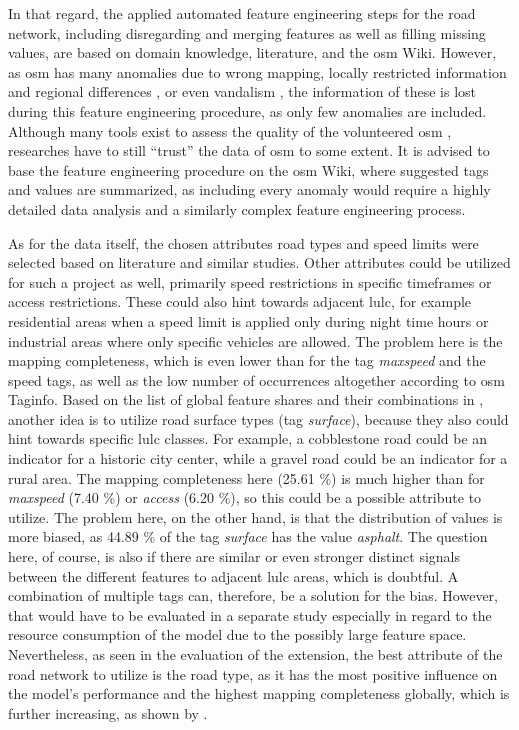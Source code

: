 In that regard, the applied automated feature engineering steps for the road network, including disregarding and merging features as well as filling missing values, are based on domain knowledge, literature, and the \gls{osm} Wiki. However, as \gls{osm} has many anomalies due to wrong mapping, locally restricted information and regional differences \autocite{Ludwig.Fendrich.ea2021}, or even vandalism \autocite{Neis.Goetz.ea2012,Vargas-Munoz.Srivastava.ea2021}, the information of these is lost during this feature engineering procedure, as only few anomalies are included. Although many tools exist to assess the quality of the volunteered \gls{osm} \autocite{Minghini.Frassinelli2019,Moradi.Roche.ea2021,Schott.Zell.ea2024}, researches have to still \enquote{trust} the data of \gls{osm} to some extent. It is advised to base the feature engineering procedure on the \gls{osm} Wiki, where suggested tags and values are summarized, as including every anomaly would require a highly detailed data analysis and a similarly complex feature engineering process.

As for the data itself, the chosen attributes road types and speed limits were selected based on literature and similar studies. Other attributes could be utilized for such a project as well, primarily speed restrictions in specific timeframes or access restrictions. These could also hint towards adjacent \gls{lulc}, for example residential areas when a speed limit is applied only during night time hours or industrial areas where only specific vehicles are allowed. The problem here is the mapping completeness, which is even lower than for the tag \emph{maxspeed} and the speed tags, as well as the low number of occurrences altogether according to \gls{osm} Taginfo. Based on the list of global feature shares and their combinations in \textcite{OSMTaginfo2024}, another idea is to utilize road surface types (tag \emph{surface}), because they also could hint towards specific \gls{lulc} classes. For example, a cobblestone road could be an indicator for a historic city center, while a gravel road could be an indicator for a rural area. The mapping completeness here (25.61 \%) is much higher than for \emph{maxspeed} (7.40 \%) or \emph{access} (6.20 \%), so this could be a possible attribute to utilize. The problem here, on the other hand, is that the distribution of values is more biased, as 44.89 \% of the tag \emph{surface} has the value \emph{asphalt}. The question here, of course, is also if there are similar or even stronger distinct signals between the different features to adjacent \gls{lulc} areas, which is doubtful. A combination of multiple tags can, therefore, be a solution for the bias. However, that would have to be evaluated in a separate study especially in regard to the resource consumption of the model due to the possibly large feature space. Nevertheless, as seen in the evaluation of the extension, the best attribute of the road network to utilize is the road type, as it has the most positive influence on the model's performance and the highest mapping completeness globally, which is further increasing, as shown by \textcite{Anderson.Sarkar.ea2019,Barrington-Leigh.Millard-Ball2017,Herfort.Lautenbach.ea2021}.     

